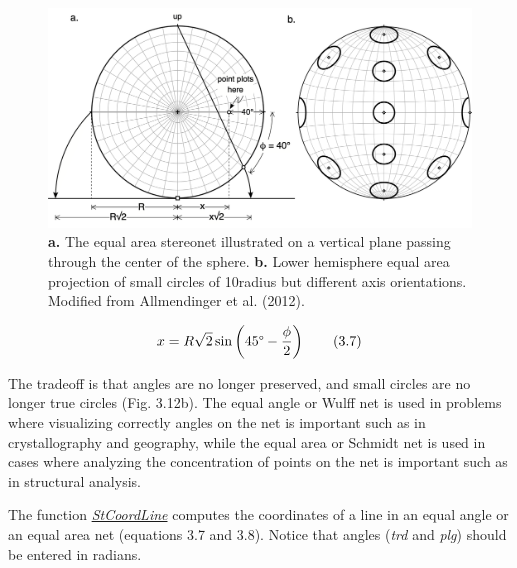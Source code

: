 \documentclass[a4paper , 12pt]{book}
\begin{document}
\begin{figure}[ht]
    \centering
    \includegraphics[width=13cm]{Figures/ch3f12.png}
    \caption{ \textbf{a.} The equal area stereonet illustrated on a vertical plane passing through the center of the sphere. \textbf{b.} Lower hemisphere equal area projection of small circles of 10\degree radius but different axis orientations. Modified from Allmendinger et al. (2012).}
\end{figure}

\begin{equation}
    x = R\sqrt{2}\sin\left(45\degree-\frac{\phi}{2}\right) \tag{3.7}
\end{equation}

The tradeoff is that angles are no longer preserved, and small circles are no longer true circles (Fig. 3.12b). The equal angle or Wulff net is used in problems where visualizing correctly angles on the net is important such as in crystallography and geography, while the equal area or Schmidt net is used in cases where analyzing the concentration of points on the net is important such as in structural analysis.

The function \href{https://github.com/nfcd/compGeo/blob/master/source/functions/StCoordLine.py}{\textit{StCoordLine}} computes the coordinates of a line in an equal angle or an equal area net (equations 3.7 and 3.8).  Notice that angles (\textit{trd} and \textit{plg}) should be entered in radians.
\end{document}

